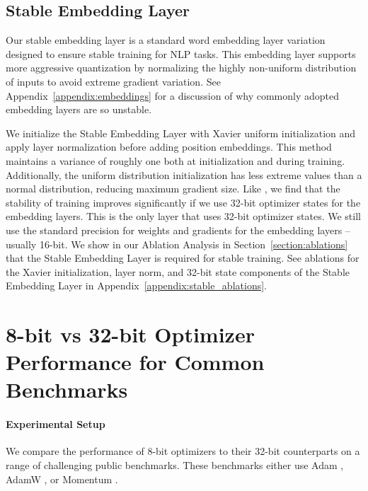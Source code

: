 \subsection{Stable Embedding Layer}
\label{section:stable_emb}

Our stable embedding layer is a standard word embedding layer variation \citep{devlin2019bert} designed to ensure stable training for NLP tasks.  This embedding layer supports more aggressive quantization by normalizing the highly non-uniform distribution of inputs to avoid extreme gradient variation. See Appendix~\ref{appendix:embeddings} for a discussion of why commonly adopted embedding layers \citep{ott2019fairseq} are so unstable.

We initialize the Stable Embedding Layer with Xavier uniform initialization \citep{glorot2010understanding} and apply layer normalization \citep{ba2016layer} before adding position embeddings. This method maintains a variance of roughly one both at initialization and during training. Additionally, the uniform distribution initialization has less extreme values than a normal distribution, reducing maximum gradient size. Like \cite{ramesh2021zero}, we find that the stability of training improves significantly if we use 32-bit optimizer states for the embedding layers. This is the only layer that uses 32-bit optimizer states. We still use the standard precision for weights and gradients for the embedding layers -- usually 16-bit. We show in our Ablation Analysis in Section~\ref{section:ablations} that the Stable Embedding Layer is required for stable training. See ablations for the Xavier initialization, layer norm, and 32-bit state components of the Stable Embedding Layer in Appendix~\ref{appendix:stable_ablations}.

\section{8-bit vs 32-bit Optimizer Performance for Common Benchmarks}
\label{sec:mainresults}

\paragraph{Experimental Setup}

We compare the performance of 8-bit optimizers to their 32-bit counterparts on a range of challenging public benchmarks. These benchmarks either use Adam \citep{kingma2014adam}, AdamW \citep{loshchilov2018fixing}, or Momentum \citep{Qian1999OnTM}. 

